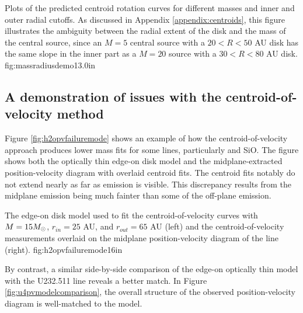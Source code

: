 \documentclass[twocolumn]{aastex61}
\begin{document}
{Plots of the predicted centroid rotation curves for different masses
and inner and outer radial cutoffs.  As discussed in Appendix \ref{appendix:centroids},
this figure illustrates the ambiguity between the radial extent of the disk and
the mass of the central source, since an $M=5$ \msun central source with a
$20<R<50$ AU disk has the same slope in the inner part as a $M=20$ \msun source
with a $30<R<80$ AU disk.
}
{fig:massradiusdemo}{1}{3.0in}


\subsection{A demonstration of issues with the centroid-of-velocity method}
Figure \ref{fig:h2opvfailuremode} shows an example of how the
centroid-of-velocity approach produces lower mass fits for some lines,
particularly \water and SiO.  The figure shows both the optically thin edge-on
disk model and the midplane-extracted position-velocity diagram with overlaid
centroid fits.  The centroid fits notably do not extend nearly as far as
emission is visible.  This discrepancy results from the midplane emission being
much fainter than some of the off-plane emission.

{The edge-on disk model used to fit the centroid-of-velocity curves with
$M=15 M_{\odot}$, $r_{in}=25$ AU, and $r_{out}=65$ AU (left) and the centroid-of-velocity measurements
overlaid on the midplane position-velocity diagram of the \water line (right).}
{fig:h2opvfailuremode}{1}{6in}

By contrast, a similar side-by-side comparison of the edge-on optically thin
model with the U232.511 line reveals a better match.  In Figure
\ref{fig:u4pvmodelcomparison}, the overall structure of the observed
position-velocity diagram is well-matched to the model.

\end{document}
